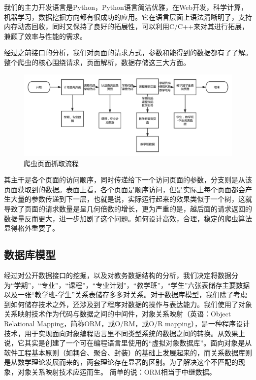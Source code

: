 \documentclass[UTF8, zihao=-4, heading=false]{ctexart}
\begin{document}
    我们的主力开发语言是Python，Python语言简洁优雅，在Web开发，科学计算，机器学习，数据挖掘方向都有很成功的应用。它在语言层面上语法清晰明了，支持内存动态回收，同时又保持了良好的拓展性，可以利用C/C++来对其进行拓展，兼顾了效率与性能的需求。\par
    
    经过之前接口的分析，我们对页面的请求方式，参数和能得到的数据都有了了解。整个爬虫的核心围绕请求，页面解析，数据存储这三大方面。\par

    \begin{figure}
        \centering
        \includegraphics[width=1.0\linewidth]{figure/seq1}
        \caption{爬虫页面抓取流程}
        \label{fig:seq1}
    \end{figure}
    \newpage
    其主干是各个页面的访问顺序，同时传递给下一个访问页面的参数，分支则是从该页面获取到的数据。表面上看，各个页面是顺序访问，但是实际上每个页面都会产生大量的参数传递到下一层，也就是说，实际运行起来的效果类似于一个树，这就导致了页面的请求数量是呈几何倍数的增长，更为严重的是，越后面的请求返回的数据量反而更大，进一步加剧了这个问题。如何设计高效，合理，稳定的爬虫算法显得格外重要了。
    
    \subsection{数据库模型}
    经过对公开数据接口的挖掘，以及对教务数据结构的分析，我们决定将数据分为“学期”，“专业”，“课程”，“专业计划”，“教学班”，“学生”六张表储存主要数据以及一张“教学班-学生”关系表储存多多对关系。对于数据库模型，我们除了考虑到如何储存技术之外，还涉及到了程序对数据的操作与表达能力。我们使用了对象关系映射技术作为代码与数据之间的中间件，对象关系映射（英语：Object Relational Mapping，简称ORM，或O/RM，或O/R mapping），是一种程序设计技术，用于实现面向对象编程语言里不同类型系统的数据之间的转换。从效果上说，它其实是创建了一个可在编程语言里使用的“虚拟对象数据库”。面向对象是从软件工程基本原则（如耦合、聚合、封装）的基础上发展起来的，而关系数据库则是从数学理论发展而来的，两套理论存在显著的区别。为了解决这个不匹配的现象，对象关系映射技术应运而生。
    简单的说：ORM相当于中继数据。\cite{wiki:Object-relational_mapping}
    
\end{document}
